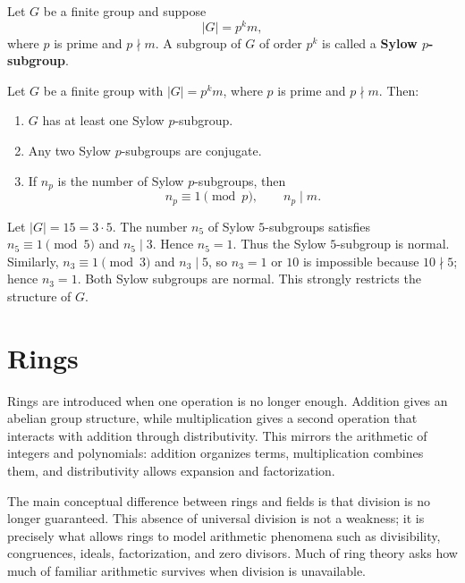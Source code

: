 \begin{definition}
Let $G$ be a finite group and suppose
\[
    |G|=p^k m,
\]
where $p$ is prime and $p\nmid m$. A subgroup of $G$ of order $p^k$ is called a \textbf{Sylow $p$-subgroup}.
\end{definition}

\begin{theorem}
Let $G$ be a finite group with $|G|=p^k m$, where $p$ is prime and $p\nmid m$. Then:
\begin{enumerate}
    \item $G$ has at least one Sylow $p$-subgroup.
    \item Any two Sylow $p$-subgroups are conjugate.
    \item If $n_p$ is the number of Sylow $p$-subgroups, then
    \[
        n_p\equiv 1\pmod p,
        \qquad
        n_p\mid m.
    \]
\end{enumerate}
\end{theorem}


\begin{example}
Let $|G|=15=3\cdot 5$. The number $n_5$ of Sylow $5$-subgroups satisfies $n_5\equiv 1\pmod 5$ and $n_5\mid 3$. Hence $n_5=1$. Thus the Sylow $5$-subgroup is normal. Similarly, $n_3\equiv 1\pmod 3$ and $n_3\mid 5$, so $n_3=1$ or $10$ is impossible because $10\nmid 5$; hence $n_3=1$. Both Sylow subgroups are normal. This strongly restricts the structure of $G$.
\end{example}

\section{Rings}


Rings are introduced when one operation is no longer enough. Addition gives an abelian group structure, while multiplication gives a second operation that interacts with addition through distributivity. This mirrors the arithmetic of integers and polynomials: addition organizes terms, multiplication combines them, and distributivity allows expansion and factorization.

The main conceptual difference between rings and fields is that division is no longer guaranteed. This absence of universal division is not a weakness; it is precisely what allows rings to model arithmetic phenomena such as divisibility, congruences, ideals, factorization, and zero divisors. Much of ring theory asks how much of familiar arithmetic survives when division is unavailable.

